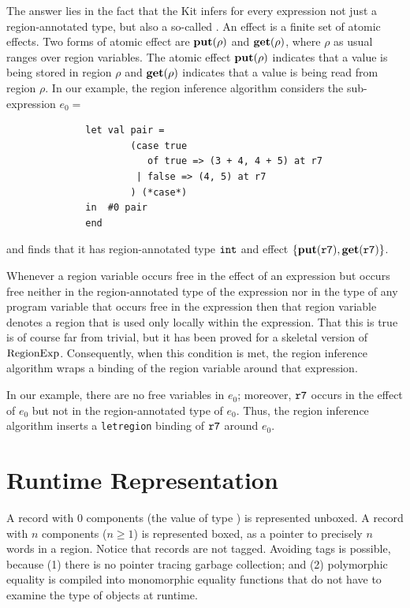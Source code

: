 \documentclass[12pt]{book}
\begin{document}
The answer lies in the fact that the Kit infers for every expression
not just a region-annotated type, but also a so-called . 
An effect is a finite set of 
atomic effects. Two forms of atomic
effect are $\mathop{\bf put}\nolimits(\rho)$ and $\mathop{\bf get}\nolimits(\rho)$, where $\rho$ as usual ranges
over region variables. The atomic effect $\mathop{\bf put}\nolimits(\rho)$ indicates that a value is being stored in
region $\rho$ and $\mathop{\bf get}\nolimits(\rho)$ indicates that a value is being read from region $\rho$.
In our example, the region inference algorithm considers the sub-expression $e_0 = $
\begin{verbatim}
              let val pair = 
                      (case true 
                         of true => (3 + 4, 4 + 5) at r7 
                       | false => (4, 5) at r7
                      ) (*case*) 
              in  #0 pair
              end  \end{verbatim}
and finds that it has region-annotated type $\hbox{\tt int}$ and effect
$\{\mathop{\bf put}\nolimits(\hbox{\tt r7}), \mathop{\bf get}\nolimits(\hbox{\tt r7})\}$.

Whenever a region variable occurs free in the effect of an expression but occurs
free neither in the region-annotated type of the expression nor in the type of any
program variable that occurs free in the expression then that region variable denotes
a region that is used only locally within the expression.  
That this is true is of course far from trivial, but it
has been proved for a skeletal version of $\hbox{\rm RegionExp}$.  Consequently, 
when this condition is met, the region inference
algorithm wraps a  binding of the region variable
around that expression.

In our example, there are no free variables in $e_0$; moreover, $\hbox{\tt r7}$
occurs in the effect of $e_0$ but not in the region-annotated type of $e_0$. Thus,
the region inference algorithm inserts a {\tt letregion} binding of $\hbox{\tt r7}$
around $e_0$.

\section{Runtime Representation}
A record with 0 components
(the value of type ) is represented
unboxed.  A record with $n$ components ($n\geq 1$) is represented
boxed, as a pointer to precisely $n$ words in a region.  Notice that
records are not tagged. Avoiding tags is possible, because (1) there
is no pointer tracing garbage collection; and (2)
polymorphic equality is compiled into
monomorphic equality functions that do not
have to examine the type of objects at runtime.
\end{document}
